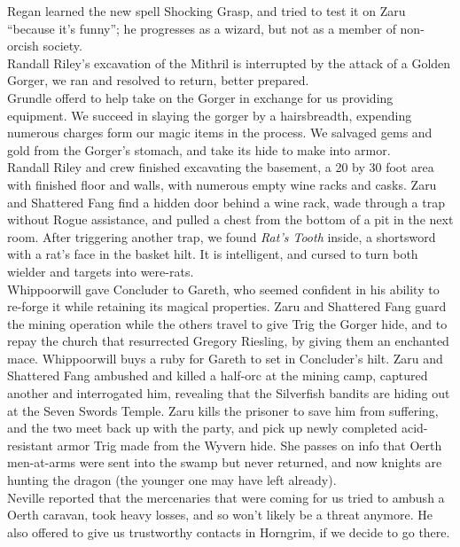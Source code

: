 \documentclass[letterpaper]{article}
\begin{document}
\noindent Regan learned the new spell Shocking Grasp, and tried to test it on Zaru ``because it's funny''; he progresses as a wizard, but not as a member of non-orcish society.\\

\noindent Randall Riley's excavation of the Mithril is interrupted by the attack of a Golden Gorger, we ran and resolved to return, better prepared.\\

\noindent Grundle offerd to help take on the Gorger in exchange for us providing equipment. We succeed in slaying the gorger by a hairsbreadth, expending numerous charges form our magic items in the process. We salvaged gems and gold from the Gorger's stomach, and take its hide to make into armor.\\

\noindent Randall Riley and crew finished excavating the basement, a 20 by 30 foot area with finished floor and walls, with numerous empty wine racks and casks.  Zaru and Shattered Fang find a hidden door behind a wine rack, wade through a trap without Rogue assistance, and pulled a chest from the bottom of a pit in the next room.  After triggering another trap, we found \emph{Rat's Tooth} inside, a shortsword with a rat's face in the basket hilt.  It is intelligent, and cursed to turn both wielder and targets into were-rats.  \\

\noindent Whippoorwill gave Concluder to Gareth, who seemed confident in his ability to re-forge it while retaining its magical properties. Zaru and Shattered Fang guard the mining operation while the others travel to give Trig the Gorger hide, and to repay the church that resurrected Gregory Riesling, by giving them an enchanted mace. Whippoorwill buys a ruby for Gareth to set in Concluder's hilt. Zaru and Shattered Fang ambushed and killed a half-orc at the mining camp, captured another and interrogated him, revealing that the Silverfish bandits are hiding out at the Seven Swords Temple. Zaru kills the prisoner to save him from suffering, and the two meet back up with the party, and pick up newly completed acid-resistant armor Trig made from the Wyvern hide.  She passes on info that Oerth men-at-arms were sent into the swamp but never returned, and now knights are hunting the dragon (the younger one may have left already).\\

\noindent Neville reported that the mercenaries that were coming for us tried to ambush a Oerth caravan, took heavy losses, and so won't likely be a threat anymore.  He also offered to give us trustworthy contacts in Horngrim, if we decide to go there.\\
\end{document}
